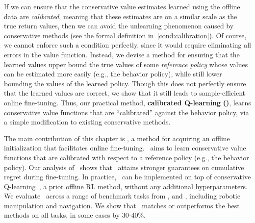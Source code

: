 If we can ensure that the conservative value estimates learned using the offline data are \emph{calibrated}, meaning that these estimates are on a similar scale as the true return values, then we can avoid the unlearning phenomenon caused by conservative methods (see the formal definition in~\ref{cond:calibration}). Of course, we cannot enforce such a condition perfectly, since it would require eliminating all errors in the value function. Instead, we devise a method for ensuring that the learned values upper bound the true values of some \emph{reference policy} whose values can be estimated more easily (e.g., the behavior policy), while still lower bounding the values of the learned policy. Though this does not perfectly ensure that the learned values are correct, we show that it still leads to sample-efficient online fine-tuning. Thus, our practical method, \textbf{calibrated Q-learning} \textbf{(\methodname)}, learns conservative value functions that are ``calibrated'' against the behavior policy, via a simple modification to existing conservative methods.

The main contribution of this chapter is \methodname, a method for acquiring an offline initialization that facilitates online fine-tuning. \methodname\ aims to learn conservative value functions that are calibrated with respect to a reference policy (e.g., the behavior policy). Our analysis of \methodname\ shows that \methodname\ attains stronger guarantees on cumulative regret during fine-tuning. In practice, \methodname\ can be implemented on top of conservative Q-learning~\cite{kumar2020conservative}, a prior offline RL method, without any additional hyperparameters. We evaluate \methodname\ across a range of benchmark tasks from \cite{fu2020d4rl}, \cite{singh2020cog} and \cite{AWAC}, including robotic manipulation and navigation. We show that \methodname\ matches or outperforms the best methods on all tasks, in some cases by 30-40\%.

